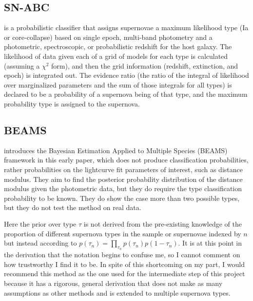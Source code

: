 \documentclass[12pt, onecolumn]{emulateapj}
\newcommand{\textul}{\underline}
\begin{document}
\subsection{SN-ABC}

\citet{Poznanski06} is a probabilistic classifier that assigns supernovae a maximum likelihood type (Ia or core-collapse) based on single epoch, multi-band photometry and a photometric, spectroscopic, or probabilistic redshift for the host galaxy.  The likelihood of data given each of a grid of models for each type is calculated (assuming a $\chi^{2}$ form), and then the grid information (redshift, extinction, and epoch) is integrated out.  The evidence ratio (the ratio of the integral of likelihood over marginalized parameters and the sum of those integrals for all types) is declared to be a probability of a supernova being of that type, and the maximum probability type is assigned to the supernova.

\subsection{BEAMS}

\citet{Kunz07} introduces the Bayesian Estimation Applied to Multiple Species (BEAMS) framework in this early paper, which does not produce classification probabilities, rather probabilities on the lightcurve fit parameters of interest, such as distance modulus.  They aim to find the posterior probability distribution of the distance modulus given the photometric data, but they do require the type classification probability to be known.  They do show the case more than two possible types, but they do not test the method on real data.
%

Here the prior over type $\tau$ is not derived from the pre-existing knowledge of the proportion of different supernova types in the sample or supernovae indexed by $n$ but instead according to $p(\tau_{n})=\prod_{\tau_{n}}p(\tau_{n})p(1-\tau_{n})$.  It is at this point in the derivation that the notation begins to confuse me, so I cannot comment on how trustworthy I find it to be.  In spite of this shortcoming on my part, I would recommend this method as the one used for the intermediate step of this project because it has a rigorous, general derivation that does not make as many assumptions as other methods and is extended to multiple supernova types.
\end{document}

